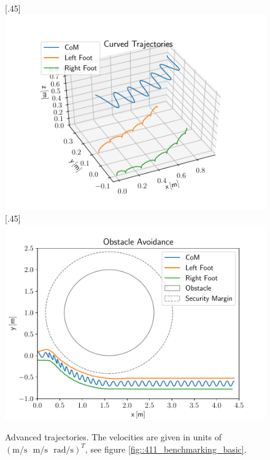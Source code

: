 \begin{figure}[h!]
	\centering
	[.45\linewidth]{\includegraphics[scale=.45]{chapters/04_experiments/01_user_controlled_walking/01_benchmarking/nmpc_turn.pdf}}
	[.45\linewidth]{\includegraphics[scale=.45]{chapters/04_experiments/01_user_controlled_walking/01_benchmarking/nmpc_obstacle.pdf}}
	\caption{Advanced trajectories. The velocities are given in units of\\$(\text{m}/\text{s}\,\,\,\,\text{m}/\text{s}\,\,\,\,\text{rad}/\text{s})^T$, see figure \ref{fig::411_benchmarking_basic}.}
	\label{fig::411_benchmarking_advanced}
\end{figure} 
